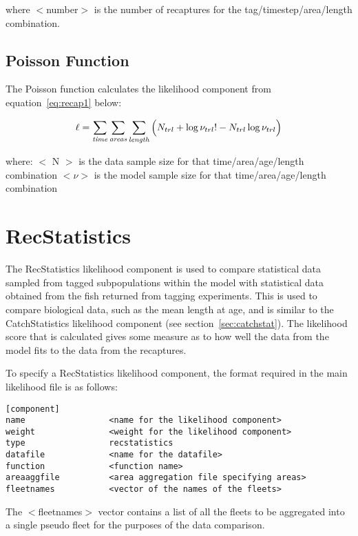 \documentclass [a4paper, 10pt]{book}
\begin{document}
where $<$number$>$ is the number of recaptures for the tag/timestep/area/length combination.

\subsection{Poisson Function}
The Poisson function calculates the likelihood component from equation~\ref{eq:recap1} below:

\begin{equation}\label{eq:recap1}
\ell = \sum_{\it time}\sum_{\it areas}\sum_{\it length} \Big( N_{trl} + \log \nu_{trl}! - N_{trl} \log \nu_{trl} \Big)
\end{equation}

where:\newline
$<$ N $>$ is the data sample size for that time/area/age/length combination\newline
$<\nu>$ is the model sample size for that time/area/age/length combination

\section{RecStatistics}\label{sec:recstat}
The RecStatistics likelihood component is used to compare statistical data sampled from tagged subpopulations within the model with statistical data obtained from the fish returned from tagging experiments.  This is used to compare biological data, such as the mean length at age, and is similar to the CatchStatistics likelihood component (see section~\ref{sec:catchstat}).  The likelihood score that is calculated gives some measure as to how well the data from the model fits to the data from the recaptures.

\bigskip
To specify a RecStatistics likelihood component, the format required in the main likelihood file is as follows:

{\small\begin{verbatim}
[component]
name                 <name for the likelihood component>
weight               <weight for the likelihood component>
type                 recstatistics
datafile             <name for the datafile>
function             <function name>
areaaggfile          <area aggregation file specifying areas>
fleetnames           <vector of the names of the fleets>
\end{verbatim}}

The $<$fleetnames$>$ vector contains a list of all the fleets to be aggregated into a single pseudo fleet for the purposes of the data comparison.
\end{document}
